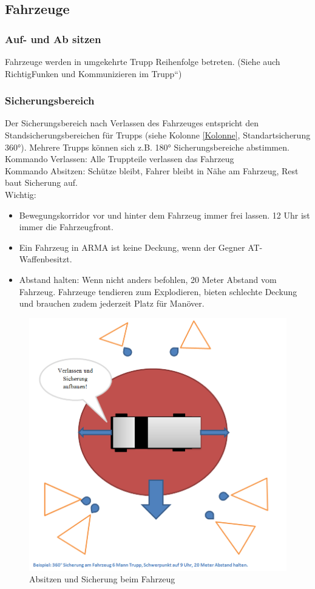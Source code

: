 \subsection{Fahrzeuge}

\subsubsection{Auf- und Ab sitzen}

Fahrzeuge werden in umgekehrte Trupp Reihenfolge betreten. (Siehe auch \glqq Richtig\grqq Funken und Kommunizieren im Trupp“) \\

\subsubsection{Sicherungsbereich}
	Der Sicherungsbereich nach Verlassen des Fahrzeuges entspricht den Standsicherungsbereichen für  Trupps (siehe Kolonne \autoref{Kolonne}, Standartsicherung 360°). Mehrere Trupps können sich z.B. 180° Sicherungsbereiche abstimmen. \\
	Kommando Verlassen:  Alle Truppteile verlassen das Fahrzeug \\
	Kommando Absitzen: Schütze bleibt, Fahrer bleibt in Nähe am Fahrzeug, Rest baut Sicherung auf.  \\
	Wichtig:
		\begin{itemize}
			\item Bewegungskorridor vor und hinter dem Fahrzeug immer frei lassen. 12 Uhr ist immer die Fahrzeugfront.
			\item Ein Fahrzeug in ARMA ist keine Deckung, wenn der Gegner AT-Waffenbesitzt.
			\item Abstand halten:  Wenn nicht anders befohlen, 20 Meter Abstand vom Fahrzeug. Fahrzeuge tendieren zum Explodieren, bieten schlechte Deckung  und brauchen zudem jederzeit Platz für Manöver.
		\end{itemize}

		\begin{figure}[htbp]
			\centering
			\includegraphics[width=15cm]{./Grafiken/Abschnitt/Fahrzeug_verlassen.png}
			\caption{Absitzen und Sicherung beim Fahrzeug}
		\end{figure}
